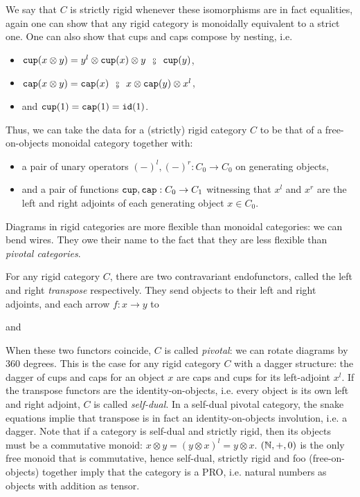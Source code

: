 We say that $C$ is strictly rigid whenever these isomorphisms are in fact equalities, again one can show that any rigid category is monoidally equivalent to a strict one.
One can also show that cups and caps compose by nesting, i.e.
\begin{itemize}
    \item $\ttcup(x \otimes y) = y^l \otimes \ttcup(x) \otimes y \s \fcmp \s \ttcup(y)$,
    \item $\ttcap(x \otimes y) = \ttcap(x) \s \fcmp \s x \otimes \ttcap(y) \otimes x^l$,
    \item and $\mathtt{cup}(1) = \mathtt{cap}(1) = \mathtt{id}(1)$.
\end{itemize}
Thus, we can take the data for a (strictly) rigid category $C$ to be that of a free-on-objects monoidal category together with:
\begin{itemize}
    \item a pair of unary operators $(-)^l, (-)^r : C_0 \to C_0$ on generating objects,
    \item and a pair of functions $\mathtt{cup}, \mathtt{cap} : C_0 \to C_1$ witnessing that $x^l$ and $x^r$ are the left and right adjoints of each generating object $x \in C_0$.
\end{itemize}
Diagrams in rigid categories are more flexible than monoidal categories: we can bend wires.
They owe their name to the fact that they are less flexible than \emph{pivotal categories}.

For any rigid category $C$, there are two contravariant endofunctors, called the left and right \emph{transpose} respectively.
They send objects to their left and right adjoints, and each arrow $f : x \to y$ to
\begin{center}
\hspace{50pt} and \hspace{50pt}
\end{center}
When these two functors coincide, $C$ is called \emph{pivotal}: we can rotate diagrams by 360 degrees.
This is the case for any rigid category $C$ with a dagger structure: the dagger of cups and caps for an object $x$ are caps and cups for its left-adjoint $x^l$.
If the transpose functors are the identity-on-objects, i.e. every object is its own left and right adjoint, $C$ is called \emph{self-dual}.
In a self-dual pivotal category, the snake equations implie that transpose is in fact an identity-on-objects involution, i.e. a dagger.
Note that if a category is self-dual and strictly rigid, then its objects must be a commutative monoid: $x \otimes y = (y \otimes x)^l = y \otimes x$.
$(\mathbb{N}, +, 0)$ is the only free monoid that is commutative, hence self-dual, strictly rigid and foo (free-on-objects) together imply that the category is a PRO, i.e. natural numbers as objects with addition as tensor.

